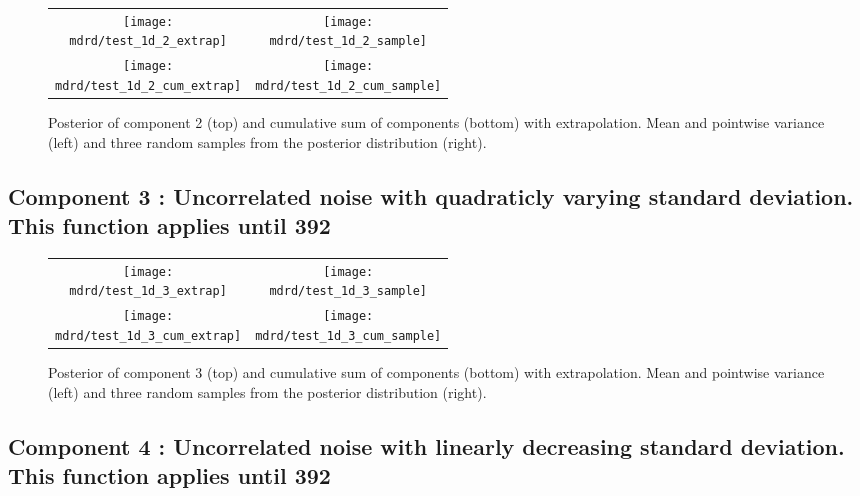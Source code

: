\documentclass{article} %
\begin{document}


\begin{figure}[H]
\newcommand{\wmgd}{0.5\columnwidth}
\newcommand{\hmgd}{3.0cm}
\newcommand{\mdrd}{test_1d}
\newcommand{\mbm}{\hspace{-0.3cm}}
\begin{tabular}{cc}
\mbm \texttt{[image: \\mdrd/test\_1d\_2\_extrap]} & \texttt{[image: \\mdrd/test\_1d\_2\_sample]} \\
\mbm \texttt{[image: \\mdrd/test\_1d\_2\_cum\_extrap]} & \texttt{[image: \\mdrd/test\_1d\_2\_cum\_sample]}
\end{tabular}
\caption{Posterior of component 2 (top) and cumulative sum of components (bottom) with extrapolation. Mean and pointwise variance (left) and three random samples from the posterior distribution (right).}
\label{fig:extrap2}
\end{figure}

\subsection{Component 3 : Uncorrelated noise with quadraticly varying standard deviation. This function applies until  392}



\begin{figure}[H]
\newcommand{\wmgd}{0.5\columnwidth}
\newcommand{\hmgd}{3.0cm}
\newcommand{\mdrd}{test_1d}
\newcommand{\mbm}{\hspace{-0.3cm}}
\begin{tabular}{cc}
\mbm \texttt{[image: \\mdrd/test\_1d\_3\_extrap]} & \texttt{[image: \\mdrd/test\_1d\_3\_sample]} \\
\mbm \texttt{[image: \\mdrd/test\_1d\_3\_cum\_extrap]} & \texttt{[image: \\mdrd/test\_1d\_3\_cum\_sample]}
\end{tabular}
\caption{Posterior of component 3 (top) and cumulative sum of components (bottom) with extrapolation. Mean and pointwise variance (left) and three random samples from the posterior distribution (right).}
\label{fig:extrap3}
\end{figure}

\subsection{Component 4 : Uncorrelated noise with linearly decreasing standard deviation. This function applies until  392}
\end{document}
